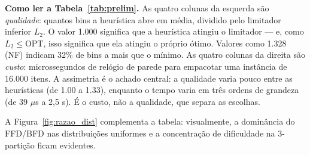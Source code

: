 \documentclass[12pt]{article}
\begin{document}
\begin{table}[ht]
\centering
\caption{Razão média A(I)/L2(I) por distribuição (esquerda) e tempo mediano ($\mu$s) por linguagem (direita), $n = 16{,}000$, distribuição uniforme discreta. Tempos: mediana de 3 execuções completas (10 repetições cada), todas com o processo fixado num \emph{performance core} (\texttt{taskset}). Os tempos são medidos nas variantes \textit{bins-only}, isto é, exatamente o mesmo trabalho em todas as linguagens. A reproduzibilidade foi verificada contra uma medição anterior independente: o desvio mediano entre as duas foi de 1{,}2\%.}
\label{tab:prelim}
\footnotesize
{}
\end{table}

\noindent\textbf{Como ler a Tabela~\ref{tab:prelim}.} As quatro colunas da esquerda são \emph{qualidade}: quantos bins a heurística abre em média, dividido pelo limitador inferior $L_2$. O valor 1.000 significa que a heurística atingiu o limitador --- e, como $L_2 \leq \mathrm{OPT}$, isso significa que ela atingiu o próprio ótimo. Valores como 1.328 (NF) indicam 32\% de bins a mais que o mínimo. As quatro colunas da direita são \emph{custo}: microssegundos de relógio de parede para empacotar uma instância de 16.000 itens. A assimetria é o achado central: a qualidade varia pouco entre as heurísticas (de 1.00 a 1.33), enquanto o tempo varia em três ordens de grandeza (de 39 $\mu$s a 2,5 s). É o custo, não a qualidade, que separa as escolhas.

A Figura~\ref{fig:razao_dist} complementa a tabela: visualmente, a dominância do FFD/BFD nas distribuições uniformes e a concentração de dificuldade na 3-partição ficam evidentes.
\end{document}
